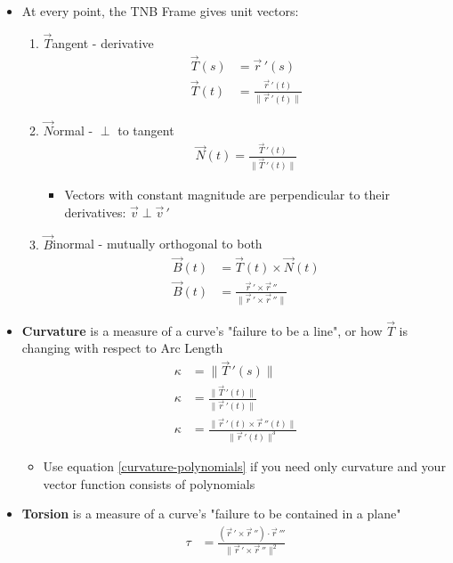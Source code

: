 \documentclass{article}
\begin{document}
\begin{itemize}
  \item At every point, the TNB Frame gives unit vectors:
  \begin{enumerate}
    \item $\vec{T}$angent - derivative
    \begin{align}
      \vec{T}(s) &= \vec{r}\,'(s) \\
      \vec{T}(t) &= \frac{\vec{r}\,'(t)}{\|\vec{r}\,'(t)\|}
    \end{align}
    \item $\vec{N}$ormal - $\perp$ to tangent
    \begin{align}
      \vec{N}(t) = \frac{\vec{T}\,'(t)}{\|\vec{T}\,'(t)\|}
    \end{align}
    \begin{itemize}
      \item Vectors with constant magnitude are perpendicular to their derivatives: $\vec{v}\perp\vec{v}\,'$
    \end{itemize}
    \item $\vec{B}$inormal - mutually orthogonal to both
    \begin{align}
      \vec{B}(t) &= \vec{T}(t)\times\vec{N}(t) \\
      \vec{B}(t) &= \frac{\vec{r}\,'\times\vec{r}\,''}{\|\vec{r}\,'\times\vec{r}\,''\|}
    \end{align}
  \end{enumerate}
  \item \textbf{Curvature} is a measure of a curve's "failure to be a line", or how $\vec{T}$ is changing with respect to Arc Length
  \begin{align}
    \kappa &= \|\vec{T}\,'(s)\| \\
    \kappa &= \frac{\|\vec{T}\,'(t)\|}{\|\vec{r}\,'(t)\|} \\
    \kappa &= \frac{\|\vec{r}\,'(t)\times\vec{r}\,''(t)\|}{\|\vec{r}\,'(t)\|^3} \label{curvature-polynomials}
  \end{align}
  \begin{itemize}
    \item Use equation \ref{curvature-polynomials} if you need only curvature and your vector function consists of polynomials
  \end{itemize}
  \item \textbf{Torsion} is a measure of a curve's "failure to be contained in a plane"
  \begin{align}
    \tau &= \frac{(\vec{r}\,'\times\vec{r}\,'')\cdot\vec{r}\,'''}{\|\vec{r}\,'\times\vec{r}\,''\|^2} \label{torsion-polynomials} \\

\end{align}
\end{itemize}
\end{document}
